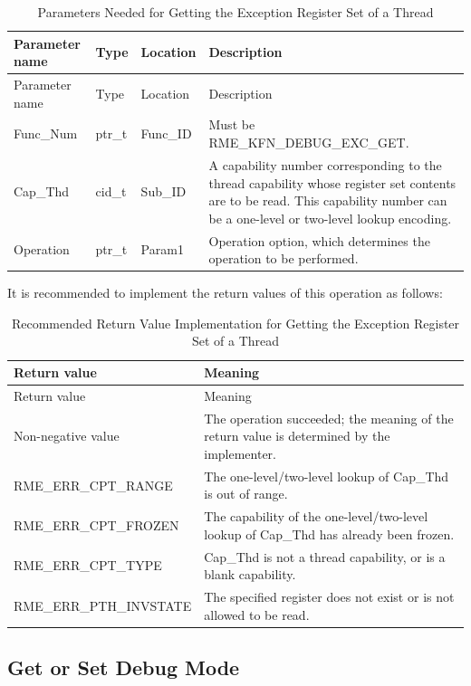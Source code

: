 \begin{xltabular}{\textwidth}{@{}>{\hsize\raggedright\arraybackslash}X>{\hsize\raggedright\arraybackslash}X>{\hsize\raggedright\arraybackslash}X>{\hsize\raggedright\arraybackslash}X@{}}
\caption{Parameters Needed for Getting the Exception Register Set of a Thread}\label{tab:8-115-get-thread-exception-register-set-parameters}\\
\toprule
Parameter name & Type & Location & Description\tabularnewline
\endfirsthead
\toprule
Parameter name & Type & Location & Description\tabularnewline
\midrule
\endhead
\bottomrule
\endlastfoot
Func\_Num & ptr\_t & Func\_ID &
Must be RME\_KFN\_DEBUG\_EXC\_GET.\tabularnewline
Cap\_Thd & cid\_t & Sub\_ID &
A capability number corresponding to the thread capability whose register set contents are to be read. This capability number can be a one-level or two-level lookup encoding.\tabularnewline
Operation & ptr\_t & Param1 &
Operation option, which determines the operation to be performed.\tabularnewline
\end{xltabular}
\nopagebreak[4]

It is recommended to implement the return values of this operation as follows:

\begin{xltabular}{\textwidth}{@{}>{\hsize\raggedright\arraybackslash}X>{\hsize\raggedright\arraybackslash}X@{}}
\caption{Recommended Return Value Implementation for Getting the Exception Register Set of a Thread}\label{tab:8-116-get-thread-exception-register-set-suggested-return-values}\\
\toprule
Return value & Meaning\tabularnewline
\endfirsthead
\toprule
Return value & Meaning\tabularnewline
\midrule
\endhead
\bottomrule
\endlastfoot
    Non-negative value & The operation succeeded; the meaning of the return value is determined by the implementer.\tabularnewline
    RME\_ERR\_CPT\_RANGE & The one-level/two-level lookup of Cap\_Thd is out of range.\tabularnewline
    RME\_ERR\_CPT\_FROZEN & The capability of the one-level/two-level lookup of Cap\_Thd has already been frozen.\tabularnewline
    RME\_ERR\_CPT\_TYPE & Cap\_Thd is not a thread capability, or is a blank capability.\tabularnewline
    RME\_ERR\_PTH\_INVSTATE & The specified register does not exist or is not allowed to be read.\tabularnewline
\end{xltabular}
\nopagebreak[4]

\subsection{Get or Set Debug Mode}\label{subsec:8-get-or-set-debug-mode}

